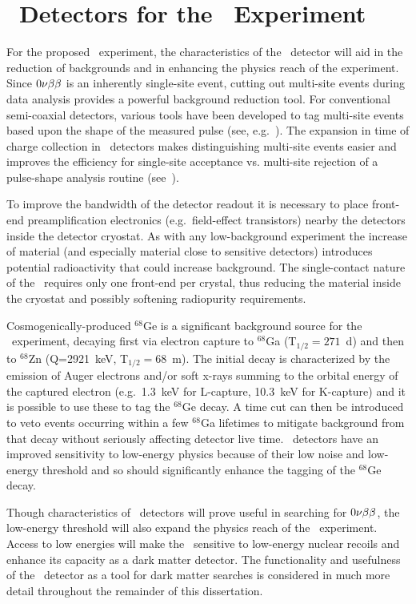 	\section{\ppc~Detectors for the \MJ~Experiment}

For the proposed \MJ~experiment, the characteristics of the \ppc~detector
will aid in the reduction of backgrounds and in enhancing the physics reach of
the experiment.  Since $0 \nu \beta \beta$ is an inherently single-site event, cutting out
multi-site events during data analysis provides a powerful background reduction
tool.  For conventional semi-coaxial detectors, various tools have been developed
to tag multi-site events based upon the shape of the measured pulse (see,
e.g.~\cite{Aal00}).  The expansion in time
of charge collection in \ppc~detectors makes distinguishing multi-site events easier and improves the efficiency for single-site acceptance vs. multi-site rejection of a pulse-shape analysis routine (see~\cite{Budjas:2009zu,Ren10}).

To improve the bandwidth of the detector readout it is necessary to
place front-end preamplification electronics (e.g.~field-effect transistors) nearby the detectors
inside the detector cryostat.  As with any low-background 
experiment the increase of material (and especially material close to
sensitive detectors) introduces potential radioactivity that could
increase background.  The single-contact nature of the \ppc~requires only one
front-end per crystal, thus reducing the material inside the cryostat and possibly
softening radiopurity requirements.

Cosmogenically-produced $^{68}$Ge is a significant background
source for the \MJ~experiment, decaying first via electron capture to $^{68}$Ga
(T$_{1/2}=271$~d) and then to $^{68}$Zn (Q=2921~keV, T$_{1/2}=68$~m).  The
initial decay is characterized by the emission of Auger electrons and/or soft x-rays
summing to the orbital energy of the captured electron (e.g.~1.3~keV for L-capture, 10.3~keV for K-capture) 
and it is possible to use these to tag the $^{68}$Ge decay.  A time cut can then be introduced to veto events
occurring within a few $^{68}$Ga lifetimes to mitigate background from that
decay without seriously affecting detector live time.   \ppc~detectors have an
improved sensitivity to low-energy physics because of their low noise and 
low-energy threshold and so should significantly enhance the tagging of the
$^{68}$Ge decay.  

Though characteristics of \ppc~detectors will prove useful in searching for
$0 \nu \beta \beta$, the low-energy threshold will also
expand the physics reach of the \MJ~experiment.  Access to low energies will 
make the \minmod~sensitive to low-energy nuclear recoils and enhance its capacity as a dark matter
detector.  The functionality and usefulness of the \ppc~detector as a tool for dark
matter searches is considered in much more detail 
throughout the remainder of this dissertation.


